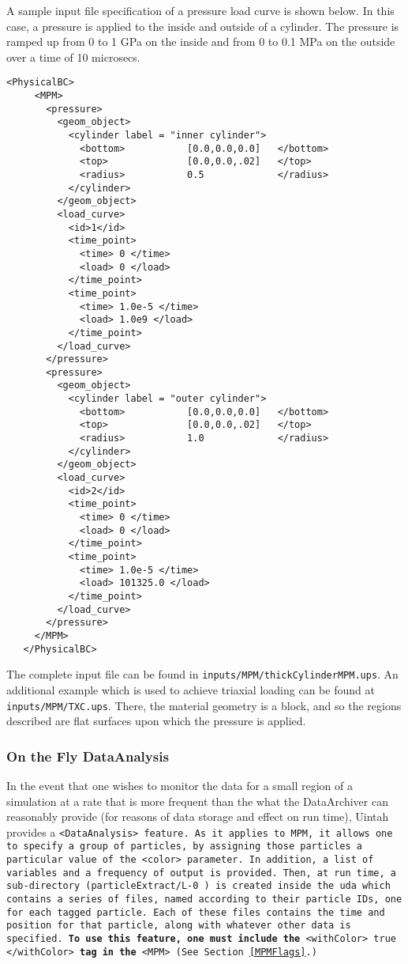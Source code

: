 A sample input file specification of a pressure load curve is shown below.
In this case, a pressure is applied to the inside and outside of a cylinder.
The pressure is ramped up from 0 to 1 GPa on the inside and from 0 to 0.1 MPa
on the outside over a time of 10 microsecs.
\begin{Verbatim}[fontsize=\footnotesize]
   <PhysicalBC>
     <MPM>
       <pressure>
         <geom_object>
           <cylinder label = "inner cylinder">
             <bottom>           [0.0,0.0,0.0]   </bottom>
             <top>              [0.0,0.0,.02]   </top>
             <radius>           0.5             </radius>
           </cylinder>
         </geom_object>
         <load_curve>
           <id>1</id>
           <time_point>
             <time> 0 </time>
             <load> 0 </load>
           </time_point>
           <time_point>
             <time> 1.0e-5 </time>
             <load> 1.0e9 </load>
           </time_point>
         </load_curve>
       </pressure>
       <pressure>
         <geom_object>
           <cylinder label = "outer cylinder">
             <bottom>           [0.0,0.0,0.0]   </bottom>
             <top>              [0.0,0.0,.02]   </top>
             <radius>           1.0             </radius>
           </cylinder>
         </geom_object>
         <load_curve>
           <id>2</id>
           <time_point>
             <time> 0 </time>
             <load> 0 </load>
           </time_point>
           <time_point>
             <time> 1.0e-5 </time>
             <load> 101325.0 </load>
           </time_point>
         </load_curve>
       </pressure>
     </MPM>
   </PhysicalBC>
\end{Verbatim}
The complete input file can be found in \verb|inputs/MPM/thickCylinderMPM.ups|. 
An additional example which is used to achieve triaxial loading can be found
at \verb|inputs/MPM/TXC.ups|.  There, the material geometry is a block, and so
the regions described are flat surfaces upon which the pressure is applied.

\subsubsection{On the Fly DataAnalysis} \label{Sec:OTFA_MPM}

In the event that one wishes to monitor the data for a small region of a
simulation at a rate that is more frequent than the what the DataArchiver
can reasonably provide (for reasons of data storage and effect on run time),
Uintah provides a \tt <DataAnalysis> \normalfont feature.  As it applies
to MPM, it allows one to specify a group of particles, by assigning those
particles a particular value of the \tt <color> \normalfont parameter.
In addition, a list of variables and a frequency of output is provided.
Then, at run time, a sub-directory (\tt particleExtract/L-0 \normalfont)
is created inside the uda which contains
a series of files, named according to their particle IDs, one for each
tagged particle.  Each of these files contains the time and position for
that particle, along with whatever other data is specified.  {\bf To use this
feature, one must include the} \tt <withColor>   true   </withColor> \normalfont
{\bf tag in the} \tt <MPM> 
(See Section~\ref{MPMFlags}.)

